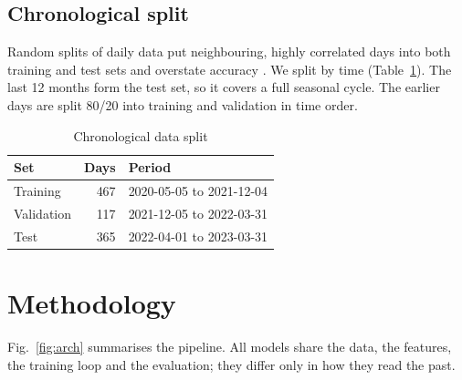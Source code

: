 \documentclass[conference]{IEEEtran}
\begin{document}
\subsection{Chronological split}
Random splits of daily data put neighbouring, highly correlated days into both training and
test sets and overstate accuracy \cite{bergmeir2012}. We split by time
(Table~\ref{tab:split}). The last 12 months form the test set, so it covers a full seasonal
cycle. The earlier days are split 80/20 into training and validation in time order.

\begin{table}[!t]
\centering
\caption{Chronological data split}
\label{tab:split}
\begin{tabular}{@{}lrl@{}}
\toprule
Set & Days & Period \\
\midrule
Training & 467 & 2020-05-05 to 2021-12-04 \\
Validation & 117 & 2021-12-05 to 2022-03-31 \\
Test & 365 & 2022-04-01 to 2023-03-31 \\
\bottomrule
\end{tabular}
\end{table}

\section{Methodology}\label{sec:method}

Fig.~\ref{fig:arch} summarises the pipeline. All models share the data, the features, the
training loop and the evaluation; they differ only in how they read the past.
\end{document}
